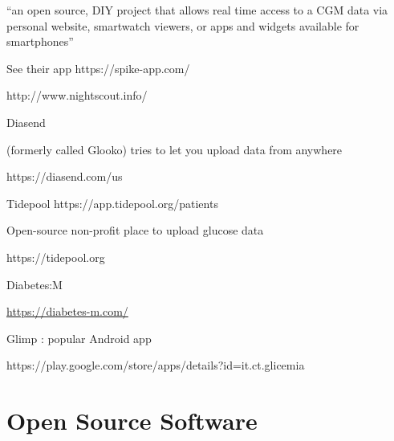 \documentclass[
]{book}
\begin{document}
``an open source, DIY project that allows real time access to a CGM data via personal website, smartwatch viewers, or apps and widgets available for smartphones''

See their app https://spike-app.com/

http://www.nightscout.info/

Diasend

(formerly called Glooko) tries to let you upload data from anywhere

https://diasend.com/us

Tidepool https://app.tidepool.org/patients

Open-source non-profit place to upload glucose data

https://tidepool.org

Diabetes:M

\url{https://diabetes-m.com/}

Glimp : popular Android app

https://play.google.com/store/apps/details?id=it.ct.glicemia

\hypertarget{open-source-software}{%
\chapter{Open Source Software}\label{open-source-software}}
\end{document}
